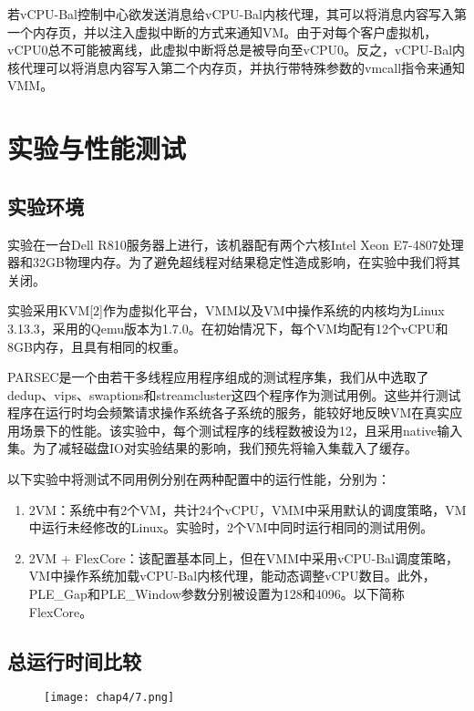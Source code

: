 若vCPU-Bal控制中心欲发送消息给vCPU-Bal内核代理，其可以将消息内容写入第一个内存页，并以注入虚拟中断的方式来通知VM。由于对每个客户虚拟机，vCPU0总不可能被离线，此虚拟中断将总是被导向至vCPU0。反之，vCPU-Bal内核代理可以将消息内容写入第二个内存页，并执行带特殊参数的vmcall指令来通知VMM。



\section{实验与性能测试}

\subsection{实验环境}

实验在一台Dell R810服务器上进行，该机器配有两个六核Intel Xeon E7-4807处理器和32GB物理内存。为了避免超线程对结果稳定性造成影响，在实验中我们将其关闭。

实验采用KVM[2]作为虚拟化平台，VMM以及VM中操作系统的内核均为Linux 3.13.3，采用的Qemu版本为1.7.0。在初始情况下，每个VM均配有12个vCPU和8GB内存，且具有相同的权重。

PARSEC\cite{bienia2008parsec}是一个由若干多线程应用程序组成的测试程序集，我们从中选取了dedup、vips、swaptions和streamcluster这四个程序作为测试用例。这些并行测试程序在运行时均会频繁请求操作系统各子系统的服务，能较好地反映VM在真实应用场景下的性能。该实验中，每个测试程序的线程数被设为12，且采用native输入集。为了减轻磁盘IO对实验结果的影响，我们预先将输入集载入了缓存。

以下实验中将测试不同用例分别在两种配置中的运行性能，分别为：

\begin{enumerate}
\item 2VM：系统中有2个VM，共计24个vCPU，VMM中采用默认的调度策略，VM中运行未经修改的Linux。实验时，2个VM中同时运行相同的测试用例。
\item 2VM + FlexCore：该配置基本同上，但在VMM中采用vCPU-Bal调度策略，VM中操作系统加载vCPU-Bal内核代理，能动态调整vCPU数目。此外，PLE\_Gap和PLE\_Window参数分别被设置为128和4096。以下简称FlexCore。
\end{enumerate}


\subsection{总运行时间比较}

\begin{figure}[!htp]
  \centering
  \texttt{[image: chap4/7.png]}
\end{figure}

